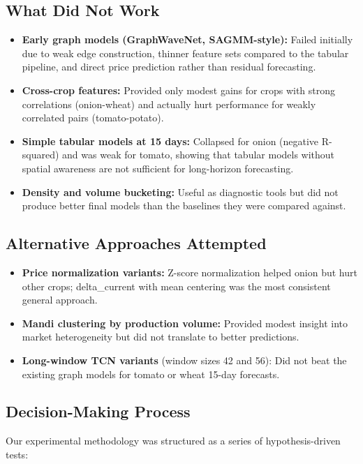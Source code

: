 \documentclass[12pt]{article}
\begin{document}
\subsection{What Did Not Work}

\begin{itemize}
\item \textbf{Early graph models (GraphWaveNet, SAGMM-style):} Failed initially due to weak edge construction, thinner feature sets compared to the tabular pipeline, and direct price prediction rather than residual forecasting.
\item \textbf{Cross-crop features:} Provided only modest gains for crops with strong correlations (onion-wheat) and actually hurt performance for weakly correlated pairs (tomato-potato).
\item \textbf{Simple tabular models at 15 days:} Collapsed for onion (negative R-squared) and was weak for tomato, showing that tabular models without spatial awareness are not sufficient for long-horizon forecasting.
\item \textbf{Density and volume bucketing:} Useful as diagnostic tools but did not produce better final models than the baselines they were compared against.
\end{itemize}

\subsection{Alternative Approaches Attempted}

\begin{itemize}
\item \textbf{Price normalization variants:} Z-score normalization helped onion but hurt other crops; delta\_current with mean centering was the most consistent general approach.
\item \textbf{Mandi clustering by production volume:} Provided modest insight into market heterogeneity but did not translate to better predictions.
\item \textbf{Long-window TCN variants} (window sizes 42 and 56): Did not beat the existing graph models for tomato or wheat 15-day forecasts.
\end{itemize}

\subsection{Decision-Making Process}

Our experimental methodology was structured as a series of hypothesis-driven tests:
\end{document}

